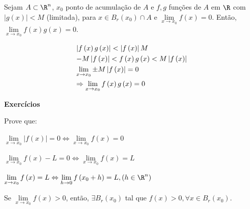 \documentclass[11pt, oneside, a4paper]{gsm-l}
\begin{document}
\begin{cor}
    Sejam $A \subset \R^n$, $x_0$ ponto de acumulação de $A$ e $f,g$ funções de $A$ em $\R$ com $\left| {g\left( x \right)} \right| < M$ (limitada), para $x \in B_r \left( {x_0 } \right) \cap A$ e $\mathop {\lim }\limits_{x \to x_0 } f\left( x \right) = 0$. Então, $\mathop {\lim }\limits_{x \to x_0 } f\left( x \right)g\left( x \right) = 0$.
\end{cor}

\begin{dem}
\[
\begin{gathered}
  \left| {f\left( x \right)g\left( x \right)} \right| < \left| {f\left( x \right)} \right|M \hfill \\
   - M\left| {f\left( x \right)} \right| < f\left( x \right)g\left( x \right) < M\left| {f\left( x \right)} \right| \hfill \\
  \mathop {\lim }\limits_{x \to x_0 }  \pm M\left| {f\left( x \right)} \right| = 0 \hfill \\
   \Rightarrow \mathop {\lim }\limits_{x \to x_0 } f\left( x \right)g\left( x \right) = 0 \hfill \\
\end{gathered}
\]

\end{dem}

\textbf{Exercícios}

Prove que:

\begin{exer}
    $\mathop {\lim }\limits_{x \to x_0 } \left| {f\left( x \right)} \right| = 0 \Leftrightarrow \mathop {\lim }\limits_{x \to x_0 } f\left( x \right) = 0$
\end{exer}

\begin{exer}
    $\mathop {\lim }\limits_{x \to x_0 } f\left( x \right) - L = 0 \Leftrightarrow \mathop {\lim }\limits_{x \to x_0 } f\left( x \right) = L$
\end{exer}

\begin{exer}
    $\mathop {\lim }\limits_{x \to x_0 } f\left( x \right) = L \Leftrightarrow \mathop {\lim }\limits_{h \to 0} f\left( {x_0  + h} \right) = L,\left( {h \in \R^n } \right)$
\end{exer}

\begin{exer}
    Se $\mathop {\lim }\limits_{x \to x_0 } f\left( x \right) > 0$, então, $\exists B_r \left( {x_0 } \right)$ tal que $f\left( x \right) > 0,\forall x \in B_r \left( {x_0 } \right)$.
\end{exer}
\end{document}
